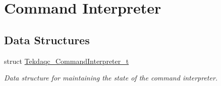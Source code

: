 \hypertarget{group__command__interpreter}{\section{Command Interpreter}
\label{group__command__interpreter}
}
\subsection*{Data Structures}
\begin{DoxyCompactItemize}
\item 
struct \hyperlink{struct_tekdaqc___command_interpreter__t}{Tekdaqc\-\_\-\-Command\-Interpreter\-\_\-t}
\begin{DoxyCompactList}\small\item\em Data structure for maintaining the state of the command interpreter. \end{DoxyCompactList}\end{DoxyCompactItemize}
